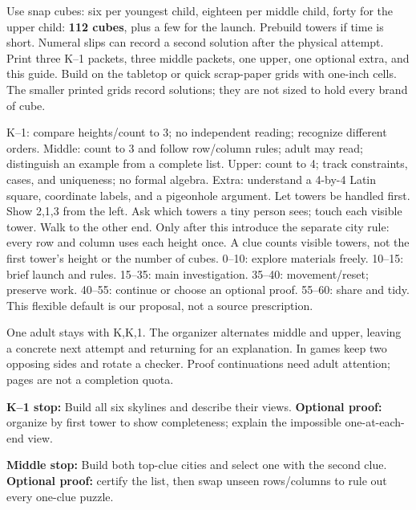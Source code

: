 \documentclass[11pt]{article}
\begin{document}
Use snap cubes: six per youngest child, eighteen per middle child, forty for the upper child: \textbf{112 cubes}, plus a few for the launch. Prebuild towers if time is short. Numeral slips can record a second solution after the physical attempt. Print three K--1 packets, three middle packets, one upper, one optional extra, and this guide. Build on the tabletop or quick scrap-paper grids with one-inch cells. The smaller printed grids record solutions; they are not sized to hold every brand of cube.

K--1: compare heights/count to 3; no independent reading; recognize different orders. Middle: count to 3 and follow row/column rules; adult may read; distinguish an example from a complete list. Upper: count to 4; track constraints, cases, and uniqueness; no formal algebra. Extra: understand a 4-by-4 Latin square, coordinate labels, and a pigeonhole argument.
Let towers be handled first. Show 2,1,3 from the left. Ask which towers a tiny person sees; touch each visible tower. Walk to the other end. Only after this introduce the separate city rule: every row and column uses each height once. A clue counts visible towers, not the first tower's height or the number of cubes.
0--10: explore materials freely. 10--15: brief launch and rules. 15--35: main investigation. 35--40: movement/reset; preserve work. 40--55: continue or choose an optional proof. 55--60: share and tidy. This flexible default is our proposal, not a source prescription.

One adult stays with K,K,1. The organizer alternates middle and upper, leaving a concrete next attempt and returning for an explanation. In games keep two opposing sides and rotate a checker. Proof continuations need adult attention; pages are not a completion quota.

\textbf{K--1 stop:} Build all six skylines and describe their views. \textbf{Optional proof:} organize by first tower to show completeness; explain the impossible one-at-each-end view.

\textbf{Middle stop:} Build both top-clue cities and select one with the second clue. \textbf{Optional proof:} certify the list, then swap unseen rows/columns to rule out every one-clue puzzle.
\end{document}
